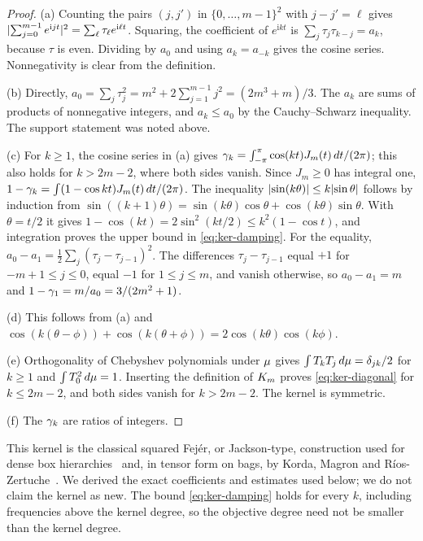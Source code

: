 \begin{proof}
(a) Counting the pairs $(j,j')$ in $\{0,\dots,m-1\}^2$ with $j-j'=\ell$
gives $\lvert \sum_{j=0}^{m-1}e^{\mathrm{i}jt}\rvert^2=\sum_{\ell}\tau_\ell e^{\mathrm{i}\ell t}$.
Squaring, the coefficient of $e^{\mathrm{i}kt}$ is
$\sum_j\tau_j\tau_{k-j}=a_k$, because $\tau$ is even. Dividing by $a_0$ and
using $a_k=a_{-k}$ gives the cosine series. Nonnegativity is clear from the
definition.

(b) Directly, $a_0=\sum_j\tau_j^2=m^2+2\sum_{j=1}^{m-1}j^2=(2m^3+m)/3$. The
$a_k$ are sums of products of nonnegative integers, and $a_k\le a_0$ by the
Cauchy--Schwarz inequality. The support statement was noted above.

(c) For $k\ge1$, the cosine series in (a) gives
$\gamma_k=\int_{-\pi}^{\pi}\cos(kt)J_m(t)\,dt/(2\pi)$; this also holds for
$k>2m-2$, where both sides vanish. Since $J_m\ge0$ has integral one,
$1-\gamma_k=\int(1-\cos kt)J_m(t)\,dt/(2\pi)$. The inequality
$\lvert \sin(k\theta)\rvert\le k\lvert \sin\theta\rvert$ follows by induction from
$\sin((k+1)\theta)=\sin(k\theta)\cos\theta+\cos(k\theta)\sin\theta$. With
$\theta=t/2$ it gives $1-\cos(kt)=2\sin^2(kt/2)\le k^2(1-\cos t)$, and
integration proves the upper bound in \eqref{eq:ker-damping}. For the
equality, $a_0-a_1=\tfrac12\sum_j(\tau_j-\tau_{j-1})^2$. The differences
$\tau_j-\tau_{j-1}$ equal $+1$ for $-m+1\le j\le0$, equal $-1$ for
$1\le j\le m$, and vanish otherwise, so $a_0-a_1=m$ and
$1-\gamma_1=m/a_0=3/(2m^2+1)$.

(d) This follows from (a) and
$\cos(k(\theta-\phi))+\cos(k(\theta+\phi))=2\cos(k\theta)\cos(k\phi)$.

(e) Orthogonality of Chebyshev polynomials under $\mu$ gives
$\int T_kT_j\,d\mu=\delta_{jk}/2$ for $k\ge1$ and $\int T_0^2\,d\mu=1$.
Inserting the definition of $K_m$ proves \eqref{eq:ker-diagonal} for
$k\le2m-2$, and both sides vanish for $k>2m-2$. The kernel is symmetric.

(f) The $\gamma_k$ are ratios of integers.
\end{proof}

This kernel is the classical squared Fejér, or Jackson-type, construction
used for dense box hierarchies~\cite{dklerk2017-improved-upper-bounds,laurent2023-effective-schmudgen}
and, in tensor form on bags, by Korda, Magron and
Ríos-Zertuche~\cite{korda2025-convergence-rates-sparsity}. We derived the
exact coefficients and estimates used below; we do not claim the kernel as
new. The bound \eqref{eq:ker-damping} holds for every $k$, including
frequencies above the kernel degree, so the objective degree need not be
smaller than the kernel degree.

